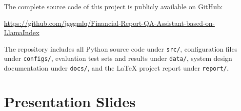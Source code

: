 \documentclass[11pt, a4paper]{article}
\begin{document}
The complete source code of this project is publicly available on GitHub:

\begin{center}
    \url{https://github.com/jgsgmlq/Financial-Report-QA-Assistant-based-on-LlamaIndex}
\end{center}

\noindent The repository includes all Python source code under \texttt{src/}, configuration files under \texttt{configs/}, evaluation test sets and results under \texttt{data/}, system design documentation under \texttt{docs/}, and the LaTeX project report under \texttt{report/}.

\section{Presentation Slides}


\end{document}
